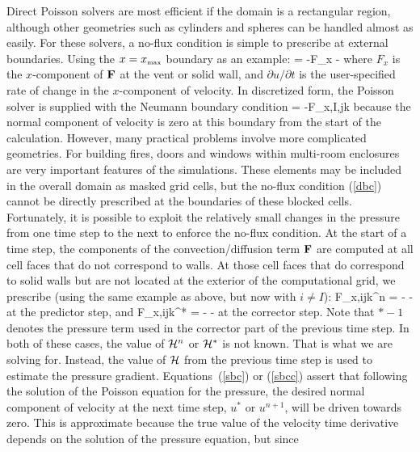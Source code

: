 Direct Poisson solvers are most efficient if the domain is a
rectangular region, although other geometries such as cylinders
and spheres can be handled almost as easily. For these solvers,
a no-flux condition is simple to prescribe at external boundaries.
Using the $x=x_{\hbox{\tiny max}}$ boundary as an example:
\be {} = -F_x -  \label{bc} \ee
where $F_x$ is the $x$-component of ${\bf F}$ at the vent or solid wall,
and $\partial u/\partial t$ is the user-specified rate of change
in the $x$-component of velocity.
In discretized form, the Poisson solver is
supplied with the Neumann boundary condition
\be {} = -F_{x,I,jk} \label{dbc} \ee
because the normal component of velocity is zero at this boundary from the start of the calculation.
However, many practical problems involve more
complicated geometries. For building fires,
doors and windows within multi-room enclosures are very important features
of the simulations. These elements may be included
in the overall domain as masked grid cells,
but the no-flux condition (\ref{dbc}) cannot be directly prescribed
at the boundaries of these blocked cells.
Fortunately, it is possible to exploit
the relatively small changes in the pressure from one time
step to the next to enforce the no-flux condition.
At the start of a time step,
the components of the convection/diffusion term ${\bf F}$ are computed
at all cell faces that do not correspond to walls.
At those cell faces that do correspond to solid walls but are not located at the exterior of the
computational grid, we prescribe (using the same example as above, but now with $i \ne I$):
\be
F_{x,ijk}^n = -  -  \label{sbc}
\ee
at the predictor step, and
\be
F_{x,ijk}^* = -  -  \label{sbcc}
\ee
at the corrector step. Note that $*-1$ denotes the pressure term used in the corrector part of the
previous time step.
In both of these cases, the value of ${\cal H}^n$ or ${\cal H}^*$ is not known. That is what we are solving for.
Instead, the value of ${\cal H}$ from the previous time step is used to estimate the pressure gradient.
Equations~(\ref{sbc}) or (\ref{sbcc}) assert that following the solution of the Poisson
equation for the pressure, the desired normal component of velocity at the next time step, $u^*$ or $u^{n+1}$, will
be driven towards zero.
This is approximate because the true value of the velocity time
derivative depends on the solution of the pressure equation, but since
